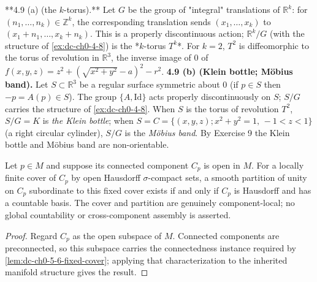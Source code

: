 \begin{example}
  \label{ex:dc-ch0-4-9}

  **4.9 (a) (the $k$-torus).** Let $G$ be the group of "integral" translations of
  $\mathbb{R}^k$: for $(n_1,\dots,n_k)\in\mathbb{Z}^k$, the corresponding
  translation sends $(x_1,\dots,x_k)$ to $(x_1+n_1,\dots,x_k+n_k)$.
  This is a properly discontinuous action; $\mathbb{R}^k/G$ (with the structure of
  \cref{ex:dc-ch0-4-8}) is the *$k$-torus $T^k$*. For $k=2$, $T^2$ is diffeomorphic to the
  torus of revolution in $\mathbb{R}^3$, the inverse image of $0$ of
  $f(x,y,z)=z^2+(\sqrt{x^2+y^2}-a)^2-r^2$.
  \textbf{4.9 (b) (Klein bottle; Möbius band).} Let $S\subset\mathbb{R}^3$ be a regular
  surface symmetric about $0$ (if $p\in S$ then $-p=A(p)\in S$). The group
  $\{A,\mathrm{Id}\}$ acts properly discontinuously on $S$; $S/G$ carries the
  structure of \cref{ex:dc-ch0-4-8}. When $S$ is the torus of revolution $T^2$, $S/G=K$ is
  \emph{the Klein bottle}; when $S=C=\{(x,y,z); x^2+y^2=1,\,-1<z<1\}$ (a right circular
  cylinder), $S/G$ is the \emph{Möbius band}. By Exercise 9 the Klein bottle and Möbius
  band are non-orientable.
\end{example}

\begin{lemma}
  \label{lem:dc-ch0-5-6-component}


  Let $p\in M$ and suppose its connected component $C_p$ is open in $M$. For a locally finite
  cover of $C_p$ by open Hausdorff $\sigma$-compact sets, a smooth partition of unity on $C_p$
  subordinate to this fixed cover exists if and only if $C_p$ is Hausdorff and has a countable
  basis. The cover and partition are genuinely component-local; no global countability or
  cross-component assembly is asserted.
\end{lemma}
\begin{proof}

  Regard $C_p$ as the open subspace of $M$. Connected components are preconnected, so this
  subspace carries the connectedness instance required by
  \cref{lem:dc-ch0-5-6-fixed-cover}; applying that characterization to the inherited manifold
  structure gives the result.
\end{proof}


